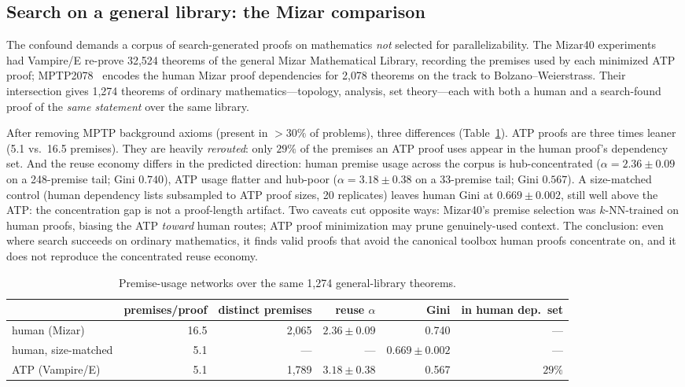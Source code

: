 \documentclass[11pt]{article}
\begin{document}
\subsection{Search on a general library: the Mizar comparison}
\label{sec:mizar}

The confound demands a corpus of search-generated proofs on mathematics \emph{not} selected for
parallelizability. The Mizar40 experiments~\cite{kaliszyk2015} had Vampire/E re-prove
32{,}524 theorems of the general Mizar Mathematical Library, recording the premises used by
each minimized ATP proof; MPTP2078~\cite{alama2014} encodes the human Mizar proof dependencies
for 2{,}078 theorems on the track to Bolzano--Weierstrass. Their intersection gives 1{,}274
theorems of ordinary mathematics---topology, analysis, set theory---each with both a human and
a search-found proof of the \emph{same statement} over the same library.

After removing MPTP background axioms (present in $>30\%$ of problems), three differences
(Table~\ref{tab:mizar}). ATP proofs are three times leaner (5.1 vs.\ 16.5 premises). They are
heavily \emph{rerouted}: only $29\%$ of the premises an ATP proof uses appear in the human
proof's dependency set. And the reuse economy differs in the predicted direction: human premise
usage across the corpus is hub-concentrated ($\alpha = 2.36 \pm 0.09$ on a 248-premise tail;
Gini $0.740$), ATP usage flatter and hub-poor ($\alpha = 3.18 \pm 0.38$ on a 33-premise tail;
Gini $0.567$). A size-matched control (human dependency lists subsampled to ATP proof sizes,
20 replicates) leaves human Gini at $0.669 \pm 0.002$, still well above the ATP: the
concentration gap is not a proof-length artifact. Two caveats cut opposite ways: Mizar40's
premise selection was $k$-NN-trained on human proofs, biasing the ATP \emph{toward} human
routes; ATP proof minimization may prune genuinely-used context. The conclusion: even where
search succeeds on ordinary mathematics, it finds valid proofs that avoid the canonical toolbox
human proofs concentrate on, and it does not reproduce the concentrated reuse economy.

\begin{table}[t]
\centering
\small
\begin{tabular}{lrrrrr}
\toprule
 & premises/proof & distinct premises & reuse $\alpha$ & Gini & in human dep.\ set \\
\midrule
human (Mizar) & 16.5 & 2{,}065 & $2.36 \pm 0.09$ & 0.740 & --- \\
human, size-matched & 5.1 & --- & --- & $0.669 \pm 0.002$ & --- \\
ATP (Vampire/E) & 5.1 & 1{,}789 & $3.18 \pm 0.38$ & 0.567 & $29\%$ \\
\bottomrule
\end{tabular}
\caption{Premise-usage networks over the same 1{,}274 general-library theorems.}
\label{tab:mizar}
\end{table}
\end{document}
